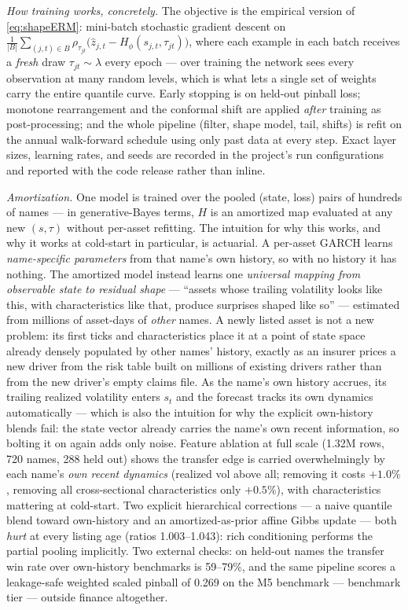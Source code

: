 \documentclass[11pt]{article}
\theoremstyle{remark}
\begin{document}
\emph{How training works, concretely.} The objective is the empirical
version of \eqref{eq:shapeERM}: mini-batch stochastic gradient descent
on
$\tfrac{1}{|B|}\sum_{(j,t)\in B}\rho_{\tau_{jt}}\!\big(\widehat{z}_{j,t}
- H_\phi(s_{j,t},\tau_{jt})\big)$,
where each example in each batch receives a \emph{fresh} draw
$\tau_{jt} \sim \lambda$ every epoch --- over training the network sees
every observation at many random levels, which is what lets a single
set of weights carry the entire quantile curve. Early stopping is on
held-out pinball loss; monotone rearrangement and the conformal shift
are applied \emph{after} training as post-processing; and the whole
pipeline (filter, shape model, tail, shifts) is refit on the annual
walk-forward schedule using only past data at every step. Exact layer
sizes, learning rates, and seeds are recorded in the project's run
configurations and reported with the code release rather than inline.

\emph{Amortization.} One model is trained over the pooled (state, loss)
pairs of hundreds of names --- in generative-Bayes terms, $H$ is an
amortized map evaluated at any new $(s,\tau)$ without per-asset
refitting. The intuition for why this works, and why it works at
cold-start in particular, is actuarial. A per-asset GARCH learns
\emph{name-specific parameters} from that name's own history, so with no
history it has nothing. The amortized model instead learns one
\emph{universal mapping from observable state to residual shape} ---
``assets whose trailing volatility looks like this, with
characteristics like that, produce surprises shaped like so'' ---
estimated from millions of asset-days of \emph{other} names. A newly
listed asset is not a new problem: its first ticks and characteristics
place it at a point of state space already densely populated by other
names' history, exactly as an insurer prices a new driver from the risk
table built on millions of existing drivers rather than from the new
driver's empty claims file. As the name's own history accrues, its
trailing realized volatility enters $s_t$ and the forecast tracks its
own dynamics automatically --- which is also the intuition for why the
explicit own-history blends fail: the state vector already carries the
name's own recent information, so bolting it on again adds only noise. Feature ablation at full scale (1.32M rows, 720 names, 288
held out) shows the transfer edge is carried overwhelmingly by each
name's \emph{own recent dynamics} (realized vol above all; removing it
costs $+1.0\%$, removing all cross-sectional characteristics only
$+0.5\%$), with characteristics mattering at cold-start. Two explicit
hierarchical corrections --- a naive quantile blend toward own-history
and an amortized-as-prior affine Gibbs update --- both \emph{hurt} at
every listing age (ratios 1.003--1.043): rich conditioning performs the
partial pooling implicitly. Two external checks: on held-out names the
transfer win rate over own-history benchmarks is 59--79\%, and the same
pipeline scores a leakage-safe weighted scaled pinball of 0.269 on the
M5 benchmark --- benchmark tier --- outside finance altogether.
\end{document}
